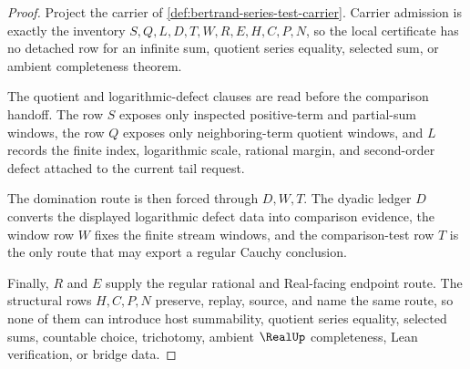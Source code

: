 \begin{proof}
Project the carrier of \autoref{def:bertrand-series-test-carrier}. Carrier admission is exactly the inventory $S,Q,L,D,T,W,R,E,H,C,P,N$, so the local certificate has no detached row for an infinite sum, quotient series equality, selected sum, or ambient completeness theorem.

The quotient and logarithmic-defect clauses are read before the comparison handoff. The row $S$ exposes only inspected positive-term and partial-sum windows, the row $Q$ exposes only neighboring-term quotient windows, and $L$ records the finite index, logarithmic scale, rational margin, and second-order defect attached to the current tail request.

The domination route is then forced through $D,W,T$. The dyadic ledger $D$ converts the displayed logarithmic defect data into comparison evidence, the window row $W$ fixes the finite stream windows, and the comparison-test row $T$ is the only route that may export a regular Cauchy conclusion.

Finally, $R$ and $E$ supply the regular rational and Real-facing endpoint route. The structural rows $H,C,P,N$ preserve, replay, source, and name the same route, so none of them can introduce host summability, quotient series equality, selected sums, countable choice, trichotomy, ambient $\RealUp$ completeness, Lean verification, or bridge data.
\end{proof}


